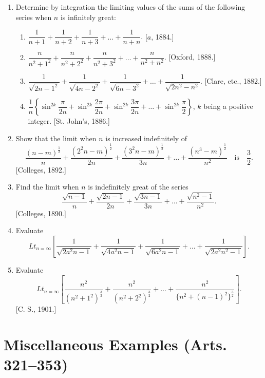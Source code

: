 \documentclass[11pt, a4paper]{article}
\newcommand{\source}[1]{\hfill\textnormal{[#1]}}
\begin{document}
\begin{enumerate}[leftmargin=2em]

\item Determine by integration the limiting values of the sums of the following series when $n$ is infinitely great:
\begin{enumerate}[label=(\roman*)]
\item $\dfrac{1}{n+1}+\dfrac{1}{n+2}+\dfrac{1}{n+3}+\dots+\dfrac{1}{n+n}$. \source{$a$, 1884.}
\item $\dfrac{n}{n^2+1^2}+\dfrac{n}{n^2+2^2}+\dfrac{n}{n^2+3^2}+\dots+\dfrac{n}{n^2+n^2}$. \source{Oxford, 1888.}
\item $\dfrac{1}{\sqrt{2n-1^2}}+\dfrac{1}{\sqrt{4n-2^2}}+\dfrac{1}{\sqrt{6n-3^2}}+\dots+\dfrac{1}{\sqrt{2n^2-n^2}}$. \source{Clare, etc., 1882.}
\item $\dfrac1n\left\{\sin^{2k}\dfrac{\pi}{2n}+\sin^{2k}\dfrac{2\pi}{2n}+\sin^{2k}\dfrac{3\pi}{2n}+\dots+\sin^{2k}\dfrac{\pi}{2}\right\}$, $k$ being a positive integer. \source{St. John's, 1886.}
\end{enumerate}

\item Show that the limit when $n$ is increased indefinitely of
\[
\dfrac{(n-m)^{\frac12}}{n}+\dfrac{(2^2n-m)^{\frac12}}{2n}+\dfrac{(3^2n-m)^{\frac12}}{3n}+\dots+\dfrac{(n^3-m)^{\frac12}}{n^2} \quad\text{is}\quad \dfrac32.
\]
\source{Colleges, 1892.}

\item Find the limit when $n$ is indefinitely great of the series
\[
\dfrac{\sqrt{n-1}}{n}+\dfrac{\sqrt{2n-1}}{2n}+\dfrac{\sqrt{3n-1}}{3n}+\dots+\dfrac{\sqrt{n^2-1}}{n^2}.
\]
\source{Colleges, 1890.}

\item Evaluate
\[
Lt_{n=\infty}\left[\dfrac{1}{\sqrt{2a^2n-1}}+\dfrac{1}{\sqrt{4a^2n-1}}+\dfrac{1}{\sqrt{6a^2n-1}}+\dots+\dfrac{1}{\sqrt{2a^2n^2-1}}\right].
\]

\item Evaluate
\[
Lt_{n=\infty}\left[\dfrac{n^2}{(n^2+1^2)^{\frac32}}+\dfrac{n^2}{(n^2+2^2)^{\frac32}}+\dots+\dfrac{n^2}{\{n^2+(n-1)^2\}^{\frac32}}\right].
\]
\source{C. S., 1901.}

\end{enumerate}

\section*{Miscellaneous Examples (Arts. 321--353)}
\end{document}

